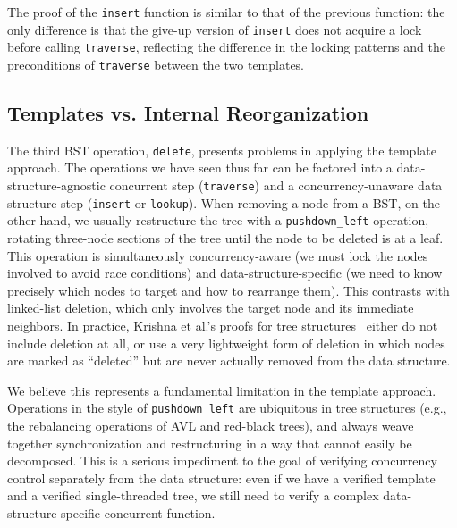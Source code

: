 \documentclass[a4paper,UKenglish,cleveref, autoref, thm-restate]{lipics-v2021}
\newcommand{\treerep}{\ensuremath{\mathsf{Node}}}
\begin{document}

The proof of the \lstinline{insert} function is similar to that of the previous function: the only difference is that the give-up version of \lstinline{insert} does not acquire a lock before calling \lstinline{traverse}, reflecting the difference in the locking patterns and the preconditions of \lstinline{traverse} between the two templates.

\subsection{Templates vs. Internal Reorganization}
\label{internal_reorganize}
The third BST operation, \lstinline{delete}, presents problems in applying the template approach. The operations we have seen thus far can be factored into a data-structure-agnostic concurrent step (\lstinline{traverse}) and a concurrency-unaware data structure step (\lstinline{insert} or \lstinline{lookup}). When removing a node from a BST, on the other hand, we usually restructure the tree with a \lstinline{pushdown_left} operation, %
rotating three-node sections of the tree until the node to be deleted is at a leaf. This operation is simultaneously concurrency-aware (we must lock the nodes involved to avoid race conditions) and data-structure-specific (we need to know precisely which nodes to target and how to rearrange them). This contrasts with linked-list deletion, which only involves the target node and its immediate neighbors. In practice, Krishna et al.'s proofs for tree structures~\cite{templates} either do not include deletion at all, or use a very lightweight form of deletion in which nodes are marked as ``deleted'' but are never actually removed from the data structure.

We believe this represents a fundamental limitation in the template approach. Operations in the style of \lstinline{pushdown_left} are ubiquitous in tree structures (e.g., the rebalancing operations of AVL and red-black trees), and always weave together synchronization and restructuring in a way that cannot easily be decomposed. This is a serious impediment to the goal of verifying concurrency control separately from the data structure: even if we have a verified template and a verified single-threaded tree, we still need to verify a complex data-structure-specific concurrent function. %
\end{document}

